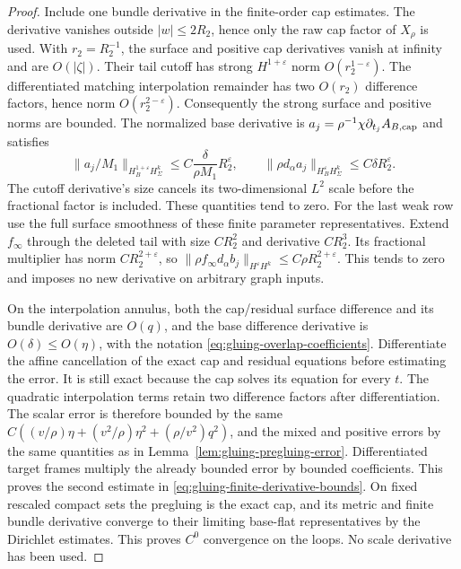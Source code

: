 \documentclass[11pt]{amsart}
\theoremstyle{definition}
\theoremstyle{remark}
\theoremstyle{plain}
\begin{document}
\begin{proof}
Include one bundle derivative in the finite-order cap estimates.
The derivative vanishes outside $|w|\leq2R_2$, hence only the
raw cap factor of $X_\rho$ is used. With $r_2=R_2^{-1}$,
the surface and positive cap derivatives vanish at infinity and
are $O(|\zeta|)$. Their tail cutoff has strong
$H^{1+\varepsilon}$ norm $O(r_2^{1-\varepsilon})$.
The differentiated matching interpolation remainder has two
$O(r_2)$ difference factors, hence norm $O(r_2^{2-\varepsilon})$.
Consequently the strong surface and positive norms are bounded.
The normalized base derivative is
$a_j=\rho^{-1}\chi\partial_{t_j}A_{B,\rm cap}$ and satisfies
\[
 \|a_j/M_1\|_{H_B^{1+\varepsilon}H^k_\Sigma}
                       \leq C\frac\delta{\rho M_1}R_2^\varepsilon,
 \qquad
 \|\rho d_\alpha a_j\|_{H_B^\varepsilon H^k_\Sigma}
                                              \leq C\delta R_2^\varepsilon.
\]
The cutoff derivative's size cancels its two-dimensional $L^2$
scale before the fractional factor is included. These quantities
tend to zero. For the last weak row use the full surface smoothness
of these finite parameter representatives. Extend $f_\infty$
through the deleted tail with size $CR_2^2$ and derivative
$CR_2^3$. Its fractional multiplier has norm $CR_2^{2+\varepsilon}$,
so $\|\rho f_\infty d_\alpha b_j\|_{H^\varepsilon H^k}
\leq C\rho R_2^{2+\varepsilon}$. This tends to zero and
imposes no new derivative on arbitrary graph inputs.

On the interpolation annulus, both the cap/residual surface difference
and its bundle derivative are $O(q)$, and the base difference
derivative is $O(\delta)\leq O(\eta)$, with the notation
\eqref{eq:gluing-overlap-coefficients}. Differentiate the affine
cancellation of the exact cap and residual equations before estimating
the error. It is still exact because the cap solves its equation
for every $t$. The quadratic interpolation terms retain two
difference factors after differentiation. The scalar error is therefore
bounded by the same
$C((v/\rho)\eta+(v^2/\rho)\eta^2+(\rho/v^2)q^2)$,
and the mixed and positive errors by the same quantities as in
Lemma~\ref{lem:gluing-pregluing-error}. Differentiated target frames
multiply the already bounded error by bounded coefficients. This
proves the second estimate in \eqref{eq:gluing-finite-derivative-bounds}.
On fixed rescaled compact sets the pregluing is the exact cap, and
its metric and finite bundle derivative converge to their limiting
base-flat representatives by the Dirichlet estimates. This proves
$C^0$ convergence on the loops. No scale derivative has been used.
\end{proof}
\end{document}
